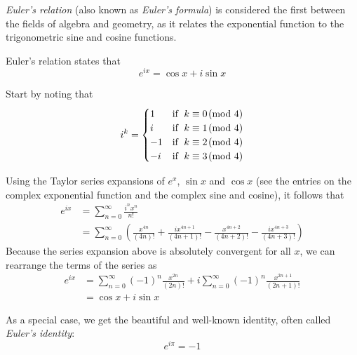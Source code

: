 \documentclass{article}
\begin{document}
{\em Euler's relation} (also known as {\em Euler's formula}) is considered the first  between the fields of algebra and geometry, as it relates the exponential function to the trigonometric sine and cosine functions.

Euler's relation states that
\[e^{ix} = \cos{x}+i\sin{x}\]

Start by noting that
\[
i^k=\begin{cases} 
1 & \mbox{if\; } k\equiv 0\!\!\pmod 4\\
i & \mbox{if\; } k\equiv 1\!\!\pmod 4\\
-1 & \mbox{if\; } k\equiv 2\!\!\pmod 4\\
-i & \mbox{if\; } k\equiv 3\!\!\pmod 4
\end{cases}
\]

Using the Taylor series expansions of $e^x$, $\sin x$ and $\cos x$ (see the entries on the complex exponential function and the complex sine and cosine), it follows that
\begin{eqnarray*}
e^{ix} & = \sum_{n=0}^{\infty} \frac{i^n x^n}{n!}\\
& = \sum_{n=0}^{\infty}\left(\frac{x^{4n}}{(4n)!}+
\frac{ix^{4n+1}}{(4n+1)!}
-\frac{x^{4n+2}}{(4n+2)!}-\frac{ix^{4n+3}}{(4n+3)!}\right)
\end{eqnarray*}
Because the series expansion above is absolutely convergent for all $x$,
we can rearrange the terms of the series as
\begin{eqnarray*}
e^{ix} &=  \sum_{n=0}^{\infty} (-1)^n\frac{x^{2n}}{(2n)!}+
i\sum_{n=0}^{\infty} (-1)^n\frac{x^{2n+1}}{(2n+1)!}\\
&= \cos{x}+i\sin{x}
\end{eqnarray*}

As a special case, we get the beautiful and well-known identity, often called \emph{Euler's identity}:
\[e^{i\pi}=-1\]
\end{document}
